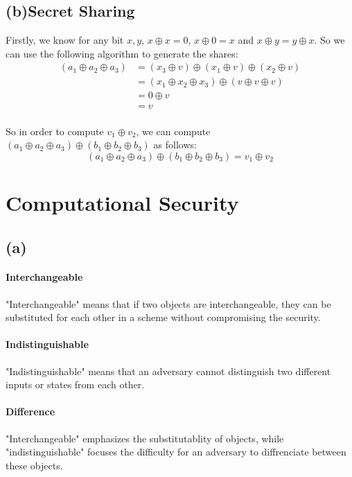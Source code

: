 \documentclass[a4paper,12pt]{article}
\begin{document}
\subsection{(b)Secret Sharing}
Firstly, we know for any bit $x, y$, $x \oplus x = 0$, $x \oplus 0 = x$ and $x \oplus y = y \oplus x$. So we can use the following algorithm to generate the shares:
\begin{equation}
    \begin{aligned}
        (a_1 \oplus a_2 \oplus a_3) & = (x_3 \oplus v) \oplus (x_1 \oplus v) \oplus (x_2 \oplus v) \\
                                    & = (x_1 \oplus x_2 \oplus x_3) \oplus (v \oplus v \oplus v)   \\
                                    & = 0 \oplus v                                                 \\
                                    & = v                                                          \\
    \end{aligned}
\end{equation}

So in order to compute $v_1 \oplus v_2$, we can compute $(a_1 \oplus a_2 \oplus a_3) \oplus (b_1 \oplus b_2 \oplus b_3)$ as follows:
\begin{equation}
    (a_1 \oplus a_2 \oplus a_3) \oplus (b_1 \oplus b_2 \oplus b_3) = v_1 \oplus v_2
\end{equation}

\section{Computational Security}
\subsection{(a)}
\paragraph*{Interchangeable}
"Interchangeable" means that if two objects are interchangeable, they can be substituted for each other in a scheme without compromising the security.
\paragraph*{Indistinguishable}
"Indistinguishable" means that an adversary cannot distinguish two different inputs or states from each other.
\paragraph*{Difference}
"Interchangeable" emphasizes the substitutablity of objects, while "indistinguishable" focuses the difficulty for an adversary to diffrenciate between these objects.
\end{document}
